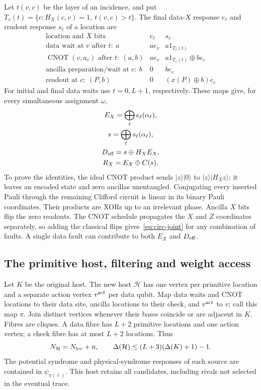 \documentclass[10pt,twocolumn]{article}
\theoremstyle{definition}
\begin{document}
Let $t(v,c)$ be the layer of an incidence, and put
$T_v(t)=\{c:H_X(c,v)=1,\ t(v,c)>t\}$. The final data-$X$ response
$e_\ell$ and readout response $s_\ell$ of a location are
\begin{equation}\label{eq:circ-response}
\begin{array}{c|c|c}
 \text{location and $X$ bits} & e_\ell &s_\ell\\ \hline
 \text{data wait at }v\text{ after }t:\ a &a e_v&a1_{T_v(t)}\\
 \operatorname{CNOT}(v,a_c)\text{ after }t:\ (a,b)&a e_v&a1_{T_v(t)}\oplus b e_c\\
 \text{ancilla preparation/wait at }c:\ b&0&b e_c\\
 \text{readout at }c:\ (P,b)&0&(x(P)\oplus b)e_c
\end{array}
\end{equation}
For initial and final data waits use $t=0,L+1$, respectively.
These maps give, for every simultaneous assignment $\omega$,
\begin{equation}\label{eq:circ-joint}
\begin{gathered}
 E_X=\bigoplus_\ell e_\ell(\alpha_\ell),\\
 s=\bigoplus_\ell s_\ell(\alpha_\ell),\\
 D_{\rm eff}=s\oplus H_XE_X,\\ R_X=E_X\oplus C(s).
\end{gathered}
\end{equation}
To prove the identities, the ideal CNOT product sends
$|z\rangle|0\rangle$ to $|z\rangle|H_Xz\rangle$; it leaves an encoded
state and zero ancillas unentangled. Conjugating every inserted Pauli
through the remaining Clifford circuit is linear in its binary Pauli
coordinates. Their products are XORs up to an irrelevant phase.
Ancilla $X$ bits flip the zero readouts. The CNOT schedule propagates
the $X$ and $Z$ coordinates separately, so adding the classical flips
gives~\eqref{eq:circ-joint} for any combination of faults. A single
data fault can contribute to both $E_X$ and $D_{\rm eff}$.

\subsection{The primitive host, filtering and weight access}
Let $K$ be the original host. The new host $\mathcal H$ has one vertex
per primitive location and a separate action vertex $v^{\rm act}$ per
data qubit. Map data waits and CNOT locations to their data site, ancilla
locations to their check, and $v^{\rm act}$ to $v$; call this map $\pi$.
Join distinct vertices whenever their bases coincide or are adjacent in
$K$. Fibres are cliques. A data fibre has $L+2$ primitive locations and
one action vertex; a check fibre has at most $L+2$ locations. Thus
\begin{equation}\label{eq:circ-host}
 N_{\mathcal H}=N_{\rm loc}+n,\qquad
 \Delta(\mathcal H)\le(L+3)(\Delta(K)+1)-1.
\end{equation}
The potential syndrome and physical-syndrome responses of each source
are contained in $\psi_{\pi(\ell)}$. This host retains all candidates,
including rivals not selected in the eventual trace.
\end{document}
